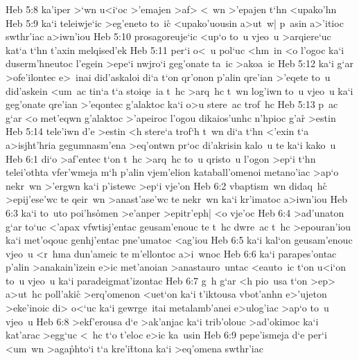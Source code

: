 \vs Heb 5:8
ka'iper
>`wn
u<i`oc
>'emajen
>af>
<~wn
>'epajen
t`hn
<upako'hn\bibvsend
\vs Heb 5:9
ka`i
teleiwje`ic
>eg'eneto
to~ic\r{}
<upako'uousin
a>ut~w|
p~asin
a>'itioc
swthr'iac
a>iwn'iou\bibvsend
\vs Heb 5:10
prosagoreuje`ic
<up`o
to~u
vjeo~u
>arqiere`uc
kat`a
t`hn
t'axin
melqised'ek\bibvsend
\vs Heb 5:11
per`i
o<~u
pol`uc
<hm~in
<o
l'ogoc
ka`i
duserm'hneutoc
l'egein
>epe`i
nwjro`i
geg'onate
ta~ic
>akoa~ic\bibvsend
\vs Heb 5:12
ka`i
g`ar
>ofe'ilontec
e>~inai
did'askaloi
di`a
t`on
qr'onon
p'alin
qre'ian
>'eqete
to~u
did'askein
<um~ac
tin`a
t`a
stoiqe~ia
t~hc
>arq~hc
t~wn
log'iwn
to~u
vjeo~u
ka`i
geg'onate
qre'ian
>'eqontec
g'alaktoc
ka`i
o>u
stere~ac
trof~hc\bibvsend
\vs Heb 5:13
p~ac
g`ar
<o
met'eqwn
g'alaktoc
>'apeiroc
l'ogou
dikaios'unhc
n'hpioc
g'a\r{r}
>estin\bibvsend
\vs Heb 5:14
tele'iwn
d'e
>estin
<h
stere`a
trof`h
t~wn
di`a
t`hn
<'exin
t`a
a>isjht'hria
gegumnasm'ena
>eq'ontwn
pr`oc
di'akrisin
kalo~u
te
ka`i
kako~u\bibvsend
\vs Heb 6:1
di`o
>af'entec
t`on
t~hc
>arq~hc
to~u
qristo~u
l'ogon
>ep`i
t`hn
telei'othta
vfer'wmeja
m`h
p'alin
vjem'elion
kataball'omenoi
metano'iac
>ap`o
nekr~wn
>'ergwn
ka`i
p'istewc
>ep`i
vje'on\bibvsend
\vs Heb 6:2
vbaptism~wn
didaq~h\r{c}
>epij'ese'wc
te
qeir~wn
>anast'ase'wc
te
nekr~wn
ka`i
kr'imatoc
a>iwn'iou\bibvsend
\vs Heb 6:3
ka`i
to~uto
poi'hs\r{o}men
>e'anper
>epitr'eph|
<o
vje'oc\bibvsend
\vs Heb 6:4
>ad'unaton
g`ar
to`uc
<'apax
vfwtisj'entac
geusam'enouc
te
t~hc
dwre~ac
t~hc
>epouran'iou
ka`i
met'oqouc
genhj'entac
pne'umatoc
<ag'iou\bibvsend
\vs Heb 6:5
ka`i
kal`on
geusam'enouc
vjeo~u
<r~hma
dun'ameic
te
m'ellontoc
a>i~wnoc\bibvsend
\vs Heb 6:6
ka`i
parapes'ontac
p'alin
>anakain'izein
e>ic
met'anoian
>anastauro~untac
<eauto~ic
t`on
u<i`on
to~u
vjeo~u
ka`i
paradeigmat'izontac\bibvsend
\vs Heb 6:7
g~h
g`ar
<h
pio~usa
t`on
>ep>
a>ut~hc
poll'akic\r{}
>erq'omenon
<uet`on
ka`i
t'iktousa
vbot'anhn
e>'ujeton
>eke'inoic
di>
o<`uc
ka`i
gewrge~itai
metalamb'anei
e>ulog'iac
>ap`o
to~u
vjeo~u\bibvsend
\vs Heb 6:8
>ekf'erousa
d`e
>ak'anjac
ka`i
trib'olouc
>ad'okimoc
ka`i
kat'arac
>egg`uc
<~hc
t`o
t'eloc
e>ic
ka~usin\bibvsend
\vs Heb 6:9
pepe'ismeja
d`e
per`i
<um~wn
>aga\r{p}hto`i
t`a
kre'i\r{t}tona
ka`i
>eq'omena
swthr'iac
